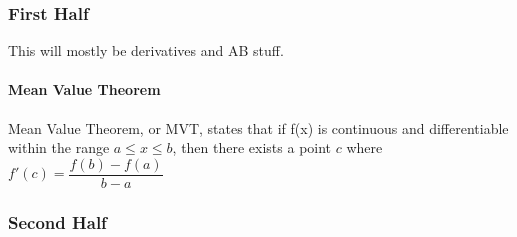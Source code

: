 \documentclass{article} %
\theoremstyle{theorem}
\theoremstyle{definition}
\begin{document}
        \subsubsection{First Half}
        This will mostly be derivatives and AB stuff.
            \paragraph{Mean Value Theorem} %
            \label{ssub:Mean Value Theorem}
                Mean Value Theorem, or MVT, states that if f(x) is continuous and differentiable within the range $a\le x \le b$, then there exists a point $c$ where $f'(c) = \dfrac{f(b)-f(a)}{b-a}$
        \subsubsection{Second Half}
\end{document}
